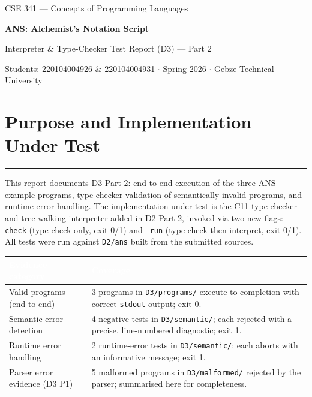 \documentclass[11pt,a4paper]{article}
\newcommand{\code}[1]{\texttt{#1}}
\newcommand{\sectionrule}{\vspace{-3pt}\textcolor{ansborder}{\rule{\textwidth}{0.6pt}}\vspace{2pt}}
\begin{document}
\begin{center}
  {\footnotesize\color{anscaption}
    CSE 341 --- Concepts of Programming Languages\par}
  \vspace{4pt}
  {\Huge\bfseries\sffamily
    ANS: Alchemist's Notation Script\par}
  \vspace{6pt}
  {\Large Interpreter \& Type-Checker Test Report (D3) --- Part 2\par}
  \vspace{8pt}
  {\footnotesize\color{anscaption}
    Students: 220104004926 \& 220104004931 \quad$\cdot$\quad
    Spring 2026 \quad$\cdot$\quad
    Gebze Technical University\par}
\end{center}
\vspace{8pt}

\section{Purpose and Implementation Under Test}
\sectionrule

This report documents D3 Part 2: end-to-end execution of the three ANS example
programs, type-checker validation of semantically invalid programs, and runtime
error handling. The implementation under test is the C11 type-checker and
tree-walking interpreter added in D2 Part 2, invoked via two new flags:
\code{--check} (type-check only, exit 0/1) and \code{--run} (type-check then
interpret, exit 0/1). All tests were run against \code{D2/ans} built from the
submitted sources.

\begin{table}[h]
\vspace{2pt}
\centering\small
{}
\begin{tabularx}{\textwidth}{@{} L{3.2cm} Y @{}}
\toprule
{}
\textcolor{white}{\textbf{Evidence category}} &
\textcolor{white}{\textbf{Coverage}} \\
\midrule
Valid programs (end-to-end) &
  3 programs in \code{D3/programs/} execute to completion with correct
  \code{stdout} output; exit 0. \\
Semantic error detection &
  4 negative tests in \code{D3/semantic/}; each rejected with a precise,
  line-numbered diagnostic; exit 1. \\
Runtime error handling &
  2 runtime-error tests in \code{D3/semantic/}; each aborts with an
  informative message; exit 1. \\
Parser error evidence (D3 P1) &
  5 malformed programs in \code{D3/malformed/} rejected by the parser;
  summarised here for completeness. \\
\bottomrule
\end{tabularx}
\end{table}
\end{document}

